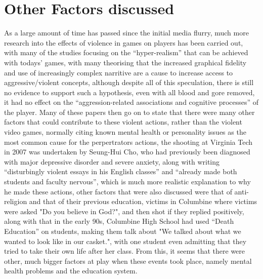 \documentclass{scrartcl}
\begin{document}
\section{Other Factors discussed}
As a large amount of time has passed since the initial media flurry, much more research into the effects of violence in games on players has been carried out, with many of the studies focusing on the ``hyper-realism'' that can be achieved with todays' games, with many theorising that the increased graphical fidelity and use of increasingly complex narritive are a cause to increase access to aggressive/violent concepts\cite{zendle2015higher}, although despite all of this speculation, there is still no evidence to support such a hypothesis, even with all blood and gore removed, it had no effect on the ``aggression-related associations and cognitive processes'' of the player\cite{ashbarry2016blood}. Many of these papers then go on to state that there were many other factors that could contribute to these violent actions, rather than the violent video games, normally citing known mental health or personality issues as the most common cause for the perpertrators actions, the shooting at Virginia Tech in 2007 was undertaken by Seung-Hui Cho, who had previously been diagnosed with major depressive disorder and severe anxiety\cite{seung}, along with writing ``disturbingly violent essays in his English classes'' and ``already made both students and faculty nervous''\cite{massacrelink}, which is much more realistic explanation to why he made these actions, other factors that were also discussed were that of anti-religion and that of their previous education, victims in Columbine where victims were asked "Do you believe in God?", and then shot if they replied positively\cite{gameskill}, along with that in the early 90s, Columbine High School had used ``Death Education'' on students, making them talk about "We talked about what we wanted to look like in our casket.", with one student even admitting that they tried to take their own life after her class\cite{gameskill}. From this, it seems that there were other, much bigger factors at play when these events took place, namely mental health problems and the education system.\\
\end{document}
